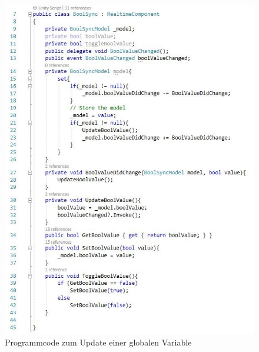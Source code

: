 \documentclass[a4paper,11pt]{article}%
\renewcommand{\\}{\vspace*{0.5\baselineskip} \newline}
\begin{document}
\begin{figure}[H]
		\begin{footnotesize}
			\includegraphics[scale=.75]{Abbildungen/boolValueChanged.jpg}\\
			\caption[Abbildung 1]{Programmcode zum Update einer globalen Variable}
			\label{boolSync}
		\end{footnotesize}
	\end{figure}

\newpage	
\end{document}
